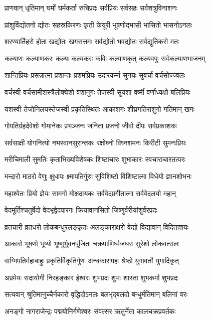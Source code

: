 \twolineshloka
{प्राणवान् धृतिमान् घर्मो घर्मकर्ता रुचिप्रदः}
{सर्वप्रियः सर्वसहः सर्वशत्रुविनाशनः}%

\twolineshloka
{प्रांशुर्विद्योतनो द्योतः सहस्रकिरणः कृती}
{केयूरी भूषणोद्भासी भासितो भासनोऽनलः}%

\twolineshloka
{शरण्यार्तिहरो होता खद्योतः खगसत्तमः}
{सर्वद्योतो भवद्योतः सर्वद्युतिकरो मतः}%

\twolineshloka
{कल्याणः कल्याणकरः कल्यः कल्यकरः कविः}
{कल्याणकृत् कल्यवपुः सर्वकल्याणभाजनम्}%

\twolineshloka
{शान्तिप्रियः प्रसन्नात्मा प्रशान्तः प्रशमप्रियः}
{उदारकर्मा सुनयः सुवर्चा वर्चसोज्ज्वलः}%

\twolineshloka
{वर्चस्वी वर्चसामीशस्त्रैलोक्येशो वशानुगः}
{तेजस्वी सुयशा वर्ष्मी वर्णाध्यक्षो बलिप्रियः}%

\twolineshloka
{यशस्वी तेजोनिलयस्तेजस्वी प्रकृतिस्थितः}
{आकाशगः शीघ्रगतिराशुगो गतिमान् खगः}%

\twolineshloka
{गोपतिर्ग्रहदेवेशो गोमानेकः प्रभञ्जनः}
{जनिता प्रजनो जीवो दीपः सर्वप्रकाशकः}%

\twolineshloka
{सर्वसाक्षी योगनित्यो नभस्वानसुरान्तकः}
{रक्षोघ्नो विघ्नशमनः किरीटी सुमनःप्रियः}%

\twolineshloka
{मरीचिमाली सुमतिः कृताभिख्यविशेषकः}
{शिष्टाचारः शुभाकारः स्वचाराचारतत्परः}%

\twolineshloka
{मन्दारो माठरो वेणुः क्षुधापः क्ष्मापतिर्गुरुः}
{सुविशिष्टो विशिष्टात्मा विधेयो ज्ञानशोभनः}%

\twolineshloka
{महाश्वेतः प्रियो ज्ञेयः सामगो मोक्षदायकः}
{सर्ववेदप्रगीतात्मा सर्ववेदलयो महान्}%

\twolineshloka
{वेदमूर्तिश्चतुर्वेदो वेदभृद्वेदपारगः}
{क्रियावानसितो जिष्णुर्वरीयांशुर्वरप्रदः}%

\twolineshloka
{व्रतचारी व्रतधरो लोकबन्धुरलङ्कृतः}
{अलङ्काराक्षरो वेद्यो विद्यावान् विदिताशयः}%

\twolineshloka
{आकारो भूषणो भूष्यो भूष्णुर्भुवनपूजितः}
{चक्रपाणिर्ध्वजधरः सुरेशो लोकवत्सलः}%

\twolineshloka
{वाग्मिपतिर्महाबाहुः प्रकृतिर्विकृतिर्गुणः}
{अन्धकारापहः श्रेष्ठो युगावर्तो युगादिकृत्}%

\twolineshloka
{अप्रमेयः सदायोगी निरहङ्कार ईश्वरः}
{शुभप्रदः शुभः शास्ता शुभकर्मा शुभप्रदः}%

\twolineshloka
{सत्यवान् श्रुतिमानुच्चैर्नकारो वृद्धिदोऽनलः}
{बलभृद्बलदो बन्धुर्मतिमान् बलिनां वरः}%

\twolineshloka
{अनङ्गो नागराजेन्द्रः पद्मयोनिर्गणेश्वरः}
{संवत्सर ऋतुर्नेता कालचक्रप्रवर्तकः}%

